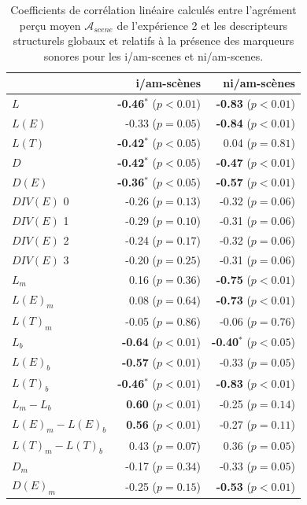 \begin{table}[t]
\centering
\begin{tabular}{l r r} 
                   &   i/am-scènes                   & ni/am-scènes \\
\hline
$L$                & \textbf{-0.46$^{*}$} ($p<0.01$) & \textbf{-0.83} ($p<0.01$)\\
$L(E)$             & -0.33 ($p=0.05$)                & \textbf{-0.84} ($p<0.01$)\\
$L(T)$             & \textbf{-0.42$^{*}$} ($p<0.05$) &  0.04 ($p=0.81$) \\
$D$                & \textbf{-0.42$^{*}$} ($p<0.05$) & \textbf{-0.47} ($p<0.01$)\\
$D(E)$             & \textbf{-0.36$^{*}$} ($p<0.05$) & \textbf{-0.57} ($p<0.01$)\\
$DIV(E)$ 0         & -0.26 ($p=0.13$)                & -0.32 ($p=0.06$)\\
$DIV(E)$ 1         & -0.29 ($p=0.10$)                & -0.31 ($p=0.06$)\\
$DIV(E)$ 2         & -0.24 ($p=0.17$)                & -0.32 ($p=0.06$)\\
$DIV(E)$ 3         & -0.20 ($p=0.25$)                & -0.31 ($p=0.06$)\\
$L_m$              & 0.16  ($p=0.36$)                & \textbf{-0.75} ($p<0.01$) \\
$L(E)_m$           & 0.08  ($p=0.64$)                & \textbf{-0.73} ($p<0.01$) \\
$L(T)_m$           & -0.05 ($p=0.86$)                & -0.06 ($p=0.76$) \\
$L_b$              & \textbf{-0.64} ($p<0.01$)       & \textbf{-0.40$^{*}$} ($p<0.05$) \\
$L(E)_b$           & \textbf{-0.57} ($p<0.01$)       & -0.33 ($p=0.05$) \\
$L(T)_b$           & \textbf{-0.46$^{*}$} ($p<0.01$) & \textbf{-0.83} ($p<0.01$) \\
$L_m-L_b$          & \textbf{0.60} ($p<0.01$)        & -0.25 ($p=0.14$) \\
$L(E)_m-L(E)_b$    & \textbf{0.56} ($p<0.01$)        & -0.27 ($p=0.11$) \\
$L(T)_m-L(T)_b$    & 0.43 ($p=0.07$)                 & 0.36 ($p=0.05$) \\
$D_m$              & -0.17 ($p=0.34$)                & -0.33 ($p=0.05$) \\
$D(E)_m$           & -0.25 ($p=0.15$)                & \textbf{-0.53} ($p<0.01$) \\
\hline
\end{tabular}
\vspace{0.5mm}
\caption{Coefficients de corrélation linéaire calculés entre l'agrément perçu moyen $\mathcal{A}_{scene}$ de l'expérience 2 et les descripteurs structurels globaux et relatifs à la présence des marqueurs sonores pour les i/am-scenes et ni/am-scenes.}
\label{tab:corrAmXP4}
\end{table}

